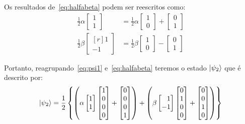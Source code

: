 Os resultados de~\eqref{eq:halfabeta} podem ser reescritos como:
\begin{equation} \label{eq:alfabetasoma}
  \begin{split}
\frac{1}{2} \alpha \begin{bmatrix}
1 \\
1 
\end{bmatrix} &= \frac{1}{2} \alpha \begin{bmatrix}
1 \\
0 
\end{bmatrix} + \begin{bmatrix}
0 \\
1 
\end{bmatrix} \\
\frac{1}{2} \beta \begin{bmatrix*}[r]
1 \\
-1
\end{bmatrix*} &= \frac{1}{2} \beta \begin{bmatrix}
1 \\
0
\end{bmatrix} - \begin{bmatrix}
0 \\
1
\end{bmatrix}
  \end{split}
\end{equation}

Portanto, reagrupando~\eqref{eq:psi1} e~\eqref{eq:halfabeta} teremos o estado $\ket{\psi_2}$ que é descrito por:
\begin{align}\label{eq:psi2matrix}
\ket{\psi_2} = \frac{1}{2} \left\{\left( \alpha \begin{bmatrix}
1 \\
1 
\end{bmatrix} \begin{bmatrix}
1 \\
0 \\
0 \\
0
\end{bmatrix} +\begin{bmatrix}
0 \\
0 \\
0 \\
1
\end{bmatrix} \right) + \left(\beta \begin{bmatrix*}[r]
1 \\
-1
\end{bmatrix*} \begin{bmatrix}
0 \\
1 \\
0 \\
0
\end{bmatrix} + \begin{bmatrix}
0 \\
0 \\
1 \\
0
\end{bmatrix}\right)\right\}
\end{align}

